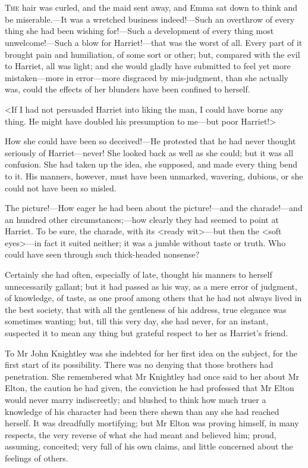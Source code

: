 \chapter[Chapter \thechapter]{}
\lettrine[lraise=0.3]{T}{he} hair was curled, and the maid sent away, and Emma sat down to think and be miserable.—It was a wretched business indeed!—Such an overthrow of every thing she had been wishing for!—Such a development of every thing most unwelcome!—Such a blow for Harriet!—that was the worst of all. Every part of it brought pain and humiliation, of some sort or other; but, compared with the evil to Harriet, all was light; and she would gladly have submitted to feel yet more mistaken—more in error—more disgraced by mis-judgment, than she actually was, could the effects of her blunders have been confined to herself.

<If I had not persuaded Harriet into liking the man, I could have borne any thing. He might have doubled his presumption to me—but poor Harriet!>

How she could have been so deceived!—He protested that he had never thought seriously of Harriet—never! She looked back as well as she could; but it was all confusion. She had taken up the idea, she supposed, and made every thing bend to it. His manners, however, must have been unmarked, wavering, dubious, or she could not have been so misled.

The picture!—How eager he had been about the picture!—and the charade!—and an hundred other circumstances;—how clearly they had seemed to point at Harriet. To be sure, the charade, with its <ready wit>—but then the <soft eyes>—in fact it suited neither; it was a jumble without taste or truth. Who could have seen through such thick-headed nonsense?

Certainly she had often, especially of late, thought his manners to herself unnecessarily gallant; but it had passed as his way, as a mere error of judgment, of knowledge, of taste, as one proof among others that he had not always lived in the best society, that with all the gentleness of his address, true elegance was sometimes wanting; but, till this very day, she had never, for an instant, suspected it to mean any thing but grateful respect to her as Harriet's friend.

To Mr John Knightley was she indebted for her first idea on the subject, for the first start of its possibility. There was no denying that those brothers had penetration. She remembered what Mr Knightley had once said to her about Mr Elton, the caution he had given, the conviction he had professed that Mr Elton would never marry indiscreetly; and blushed to think how much truer a knowledge of his character had been there shewn than any she had reached herself. It was dreadfully mortifying; but Mr Elton was proving himself, in many respects, the very reverse of what she had meant and believed him; proud, assuming, conceited; very full of his own claims, and little concerned about the feelings of others.

